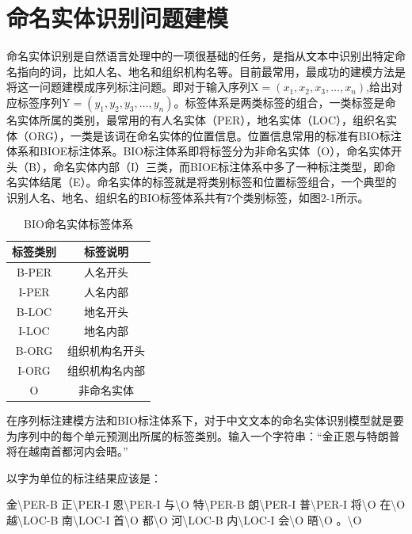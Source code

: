 \documentclass[winfonts,master,oneside,nobackinfo]{njuthesis}
\begin{document}
\section{命名实体识别问题建模}
命名实体识别是自然语言处理中的一项很基础的任务，是指从文本中识别出特定命名指向的词，比如人名、地名和组织机构名等。目前最常用，最成功的建模方法是将这一问题建模成序列标注问题。即对于输入序列$\mathrm { X } = \left( x _ { 1 } , x _ { 2 } , x _ { 3 } , \dots , x _ { n } \right)$,给出对应标签序列$\mathrm { Y } = \left( y _ { 1 } , y _ { 2 } , y _ { 3 } , \dots , y _ { n } \right)$。标签体系是两类标签的组合，一类标签是命名实体所属的类别，最常用的有人名实体（PER），地名实体（LOC），组织名实体（ORG），一类是该词在命名实体的位置信息。位置信息常用的标准有BIO标注体系和BIOE标注体系。BIO标注体系即将标签分为非命名实体（O），命名实体开头（B），命名实体内部（I）三类，而BIOE标注体系中多了一种标注类型，即命名实体结尾（E）。命名实体的标签就是将类别标签和位置标签组合，一个典型的识别人名、地名、组织名的BIO标签体系共有7个类别标签，如图2-1所示。

\begin{table}[ht]
\centering
\begin{tabular}{cc} %
\hline 
标签类别&标签说明\\
\hline  
B-PER&人名开头\\
I-PER&人名内部\\
B-LOC&地名开头\\
I-LOC&地名内部\\
B-ORG&组织机构名开头\\
I-ORG&组织机构名内部\\
O&非命名实体\\
\hline 
\end{tabular}
\caption{BIO命名实体标签体系}
\end{table}

在序列标注建模方法和BIO标注体系下，对于中文文本的命名实体识别模型就是要为序列中的每个单元预测出所属的标签类别。输入一个字符串：“金正恩与特朗普将在越南首都河内会晤。”

以字为单位的标注结果应该是：

金\textbackslash PER-B 正\textbackslash PER-I 恩\textbackslash PER-I 与\textbackslash O 特\textbackslash PER-B 朗\textbackslash PER-I 普\textbackslash PER-I 将\textbackslash O 在\textbackslash O 越\textbackslash LOC-B 南\textbackslash LOC-I 首\textbackslash O 都\textbackslash O 河\textbackslash LOC-B 内\textbackslash LOC-I 会\textbackslash O 晤\textbackslash O 。\textbackslash O
\end{document}
